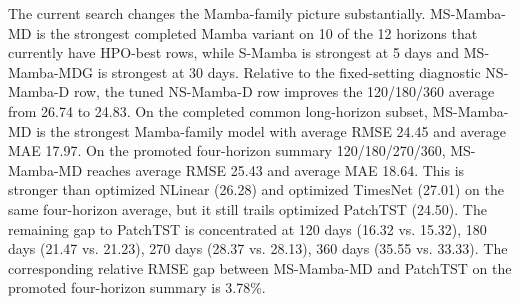 \begin{table}[t]
\centering
\caption{Best currently completed Mamba-HPO row by horizon.}
\label{tab:gld-mamba-hpo-horizon}
\small
{}
\end{table}

The current search changes the Mamba-family picture substantially.
MS-Mamba-MD is the strongest completed Mamba variant on 10 of the 12 horizons that currently have HPO-best rows, while S-Mamba is strongest at 5 days and MS-Mamba-MDG is strongest at 30 days.
Relative to the fixed-setting diagnostic NS-Mamba-D row, the tuned NS-Mamba-D row improves the 120/180/360 average from 26.74 to 24.83.
On the completed common long-horizon subset, MS-Mamba-MD is the strongest Mamba-family model with average RMSE 24.45 and average MAE 17.97.
On the promoted four-horizon summary 120/180/270/360, MS-Mamba-MD reaches average RMSE 25.43 and average MAE 18.64.
This is stronger than optimized NLinear (26.28) and optimized TimesNet (27.01) on the same four-horizon average, but it still trails optimized PatchTST (24.50).
The remaining gap to PatchTST is concentrated at 120 days (16.32 vs. 15.32), 180 days (21.47 vs. 21.23), 270 days (28.37 vs. 28.13), 360 days (35.55 vs. 33.33).
The corresponding relative RMSE gap between MS-Mamba-MD and PatchTST on the promoted four-horizon summary is 3.78\%.

